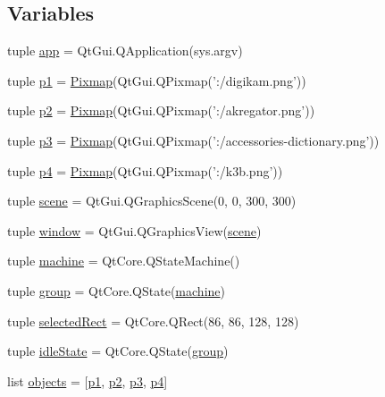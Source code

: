 \subsection*{Variables}
\begin{DoxyCompactItemize}
\item 
tuple \hyperlink{namespaceappchooser_a7d64d8e37e143b6d5b4fa889c051f427}{app} = Qt\+Gui.\+Q\+Application(sys.\+argv)
\item 
tuple \hyperlink{namespaceappchooser_a0666ded3ab0286b6d03073e3a3c8c578}{p1} = \hyperlink{classappchooser_1_1Pixmap}{Pixmap}(Qt\+Gui.\+Q\+Pixmap('\+:/digikam.\+png'))
\item 
tuple \hyperlink{namespaceappchooser_a64961f0ddcc5bc14c7ae51cc891f6d05}{p2} = \hyperlink{classappchooser_1_1Pixmap}{Pixmap}(Qt\+Gui.\+Q\+Pixmap('\+:/akregator.\+png'))
\item 
tuple \hyperlink{namespaceappchooser_a5b229def25670d69ce74fb6b77c1ca4e}{p3} = \hyperlink{classappchooser_1_1Pixmap}{Pixmap}(Qt\+Gui.\+Q\+Pixmap('\+:/accessories-\/dictionary.\+png'))
\item 
tuple \hyperlink{namespaceappchooser_ad5d687a3909fca32f123761b1ee6402c}{p4} = \hyperlink{classappchooser_1_1Pixmap}{Pixmap}(Qt\+Gui.\+Q\+Pixmap('\+:/k3b.\+png'))
\item 
tuple \hyperlink{namespaceappchooser_a1c0abb0bd7ec56debeec97278c7ff008}{scene} = Qt\+Gui.\+Q\+Graphics\+Scene(0, 0, 300, 300)
\item 
tuple \hyperlink{namespaceappchooser_a6a1831720cdc572acdb574609029b6b0}{window} = Qt\+Gui.\+Q\+Graphics\+View(\hyperlink{namespaceappchooser_a1c0abb0bd7ec56debeec97278c7ff008}{scene})
\item 
tuple \hyperlink{namespaceappchooser_aa1ec60a035b0714db259d8f2a52a614d}{machine} = Qt\+Core.\+Q\+State\+Machine()
\item 
tuple \hyperlink{namespaceappchooser_a4cba4601f9776cb9ed1bfc83873f329e}{group} = Qt\+Core.\+Q\+State(\hyperlink{namespaceappchooser_aa1ec60a035b0714db259d8f2a52a614d}{machine})
\item 
tuple \hyperlink{namespaceappchooser_a44546cff85daaa95caf6e7be07f44317}{selected\+Rect} = Qt\+Core.\+Q\+Rect(86, 86, 128, 128)
\item 
tuple \hyperlink{namespaceappchooser_ac69e258bbe16049879b2e76c3cef39d8}{idle\+State} = Qt\+Core.\+Q\+State(\hyperlink{namespaceappchooser_a4cba4601f9776cb9ed1bfc83873f329e}{group})
\item 
list \hyperlink{namespaceappchooser_a1a06713bdd14d024a6bd4701471b80b1}{objects} = \mbox{[}\hyperlink{namespaceappchooser_a0666ded3ab0286b6d03073e3a3c8c578}{p1}, \hyperlink{namespaceappchooser_a64961f0ddcc5bc14c7ae51cc891f6d05}{p2}, \hyperlink{namespaceappchooser_a5b229def25670d69ce74fb6b77c1ca4e}{p3}, \hyperlink{namespaceappchooser_ad5d687a3909fca32f123761b1ee6402c}{p4}\mbox{]}
\end{DoxyCompactItemize}


